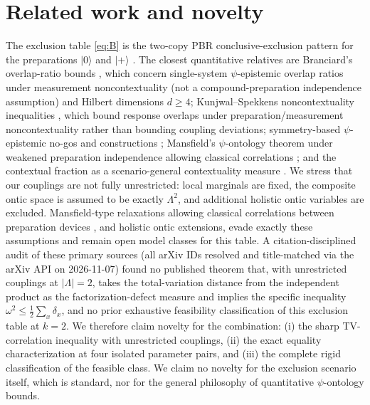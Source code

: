 \documentclass[11pt,a4paper]{article}
\newcommand{\dd}{\delta}
\begin{document}
\section{Related work and novelty}
\label{sec:related}
The exclusion table \eqref{eq:B} is the two-copy PBR conclusive-exclusion pattern for the preparations $|0\rangle$ and $|+\rangle$ \cite{pbr}. The closest quantitative relatives are Branciard's overlap-ratio bounds \cite{branciard}, which concern single-system $\psi$-epistemic overlap ratios under measurement noncontextuality (not a compound-preparation independence assumption) and Hilbert dimensions $d\ge4$; Kunjwal--Spekkens noncontextuality inequalities \cite{ks2}, which bound response overlaps under preparation/measurement noncontextuality rather than bounding coupling deviations; symmetry-based $\psi$-epistemic no-gos and constructions \cite{aaronson}; Mansfield's $\psi$-ontology theorem under weakened preparation independence allowing classical correlations \cite{mansfield}; and the contextual fraction as a scenario-general contextuality measure \cite{abramsky}. We stress that our couplings are not fully unrestricted: local marginals are fixed, the composite ontic space is assumed to be exactly $\Lambda^2$, and additional holistic ontic variables are excluded. Mansfield-type relaxations allowing classical correlations between preparation devices \cite{mansfield}, and holistic ontic extensions, evade exactly these assumptions and remain open model classes for this table. A citation-disciplined audit of these primary sources (all arXiv IDs resolved and title-matched via the arXiv API on 2026-11-07) found no published theorem that, with unrestricted couplings at $|\Lambda|=2$, takes the total-variation distance from the independent product as the factorization-defect measure and implies the specific inequality $\omega^2\le\tfrac12\sum_x\dd_x$, and no prior exhaustive feasibility classification of this exclusion table at $k=2$. We therefore claim novelty for the combination: (i) the sharp TV-correlation inequality with unrestricted couplings, (ii) the exact equality characterization at four isolated parameter pairs, and (iii) the complete rigid classification of the feasible class. We claim no novelty for the exclusion scenario itself, which is standard, nor for the general philosophy of quantitative $\psi$-ontology bounds.
\end{document}
